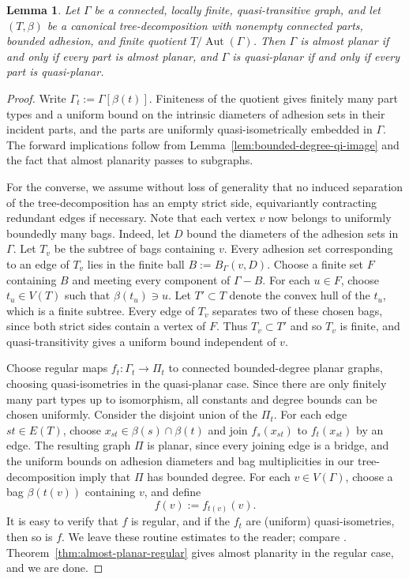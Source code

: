 \documentclass[10pt,a4paper]{amsart}
\newtheorem{lemma}[theorem]{Lemma}
\theoremstyle{definition}
\begin{document}
\begin{lemma}\label{lem:planar-assembly}
Let $\Gamma$ be a connected, locally finite, quasi-transitive graph, and let $(T,\beta)$ be a canonical tree-decomposition with nonempty connected parts, bounded adhesion, and finite quotient $T/\operatorname{Aut}(\Gamma)$.
Then $\Gamma$ is almost planar if and only if every part is almost planar, and $\Gamma$ is quasi-planar if and only if every part is quasi-planar.
\end{lemma}

\begin{proof}
Write $\Gamma_t:=\Gamma[\beta(t)]$. Finiteness of the quotient gives finitely many part types and a uniform bound on the intrinsic diameters of adhesion sets in their incident parts, and the parts are uniformly quasi-isometrically embedded in $\Gamma$. The forward implications follow from Lemma~\ref{lem:bounded-degree-qi-image} and the fact that almost planarity passes to subgraphs.

For the converse, we assume without loss of generality that no induced separation of the tree-decomposition has an empty strict side, equivariantly contracting redundant edges if necessary.  
Note that each vertex $v$ now belongs to uniformly boundedly many bags. Indeed, let $D$ bound the diameters of the adhesion sets in $\Gamma$. Let $T_v$ be the subtree of bags containing $v$. Every adhesion set corresponding to an edge of $T_v$ lies in the finite ball $B:=B_\Gamma(v,D)$. Choose a finite set $F$ containing $B$ and meeting every component of $\Gamma-B$. For each $u \in F$, choose $t_u \in V(T)$ such that $\beta(t_u) \ni u$. Let $T' \subset T$ denote the convex hull of the $t_u$, which is a finite subtree. Every edge of $T_v$ separates two of these chosen bags, since both strict sides contain a vertex of $F$. Thus $T_v \subset T'$ and so $T_v$ is finite, and quasi-transitivity gives a uniform bound independent of $v$.

Choose regular maps $f_t:\Gamma_t\to \Pi_t$ to connected bounded-degree planar graphs, choosing quasi-isometries in the quasi-planar case. Since there are only finitely many part types up to isomorphism, all constants and degree bounds can be chosen uniformly. Consider the disjoint union of the $\Pi_t$. For each edge $st\in E(T)$, choose $x_{st}\in\beta(s)\cap\beta(t)$ and join $f_s(x_{st})$ to $f_t(x_{st})$ by an edge. The resulting graph $\Pi$ is planar, since every joining edge is a bridge, and the uniform bounds on adhesion diameters and bag multiplicities in our tree-decomposition imply that $\Pi$ has bounded degree.
For each $v\in V(\Gamma)$, choose a bag $\beta(t(v))$ containing $v$, and define
$$
f(v):=f_{t(v)}(v).
$$
It is easy to verify that $f$ is regular, and if the $f_t$ are (uniform) quasi-isometries, then so is $f$. We leave these routine estimates to the reader; compare \cite[Sec.~3]{Esperet_Giocanti_2024}. Theorem~\ref{thm:almost-planar-regular} gives almost planarity in the regular case, and we are done.
\end{proof}
\end{document}
